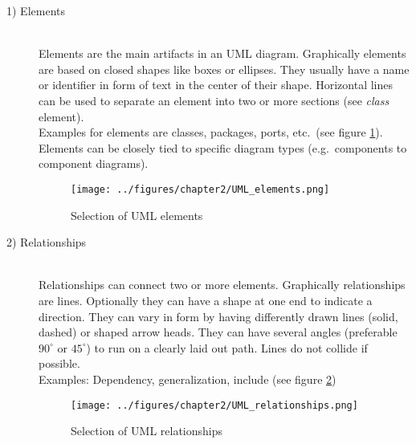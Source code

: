 \documentclass[twoside, openright, 12pt]{book}
\begin{document}
\begin{description}
\item[1) Elements]\hfill \\
Elements are the main artifacts in an UML diagram.
Graphically elements are based on closed shapes like boxes or ellipses.
They usually have a name or identifier in form of text in the center of their shape. Horizontal lines can be used to separate an element into two or more sections (see \textit{class} element). \\
Examples for elements are classes, packages, ports, etc.~(see figure \ref{fig:UML_elements}).
Elements can be closely tied to specific diagram types (e.g.~components to component diagrams).

\begin{figure}[htb]
	\centering
	\texttt{[image: ../figures/chapter2/UML\_elements.png]}
	\caption{Selection of UML elements}
	\label{fig:UML_elements}
\end{figure}

%

\item[2) Relationships]\hfill \\
Relationships can connect two or more elements.
Graphically relationships are lines.
Optionally they can have a shape at one end to indicate a direction.
They can vary in form by having differently drawn lines (solid, dashed) or shaped arrow heads.
They can have several angles (preferable $90^{\circ}$ or $45^{\circ}$) to run on a clearly laid out path.
Lines do not collide if possible. \\
Examples: Dependency, generalization, include (see figure \ref{fig:UML_relationships})

\begin{figure}[htb]
	\centering
	\texttt{[image: ../figures/chapter2/UML\_relationships.png]}
	\caption{Selection of UML relationships}
	\label{fig:UML_relationships}
\end{figure}
\end{description}
\end{document}
